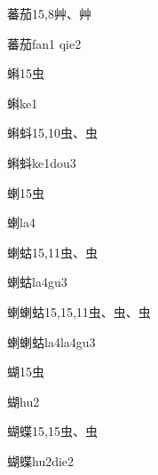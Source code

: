 \begin{Entry}{蕃茄}{15,8}{⾋、⾋}
  \begin{Phonetics}{蕃茄}{fan1 qie2}
  \end{Phonetics}
\end{Entry}

\begin{Entry}{蝌}{15}{⾍}
  \begin{Phonetics}{蝌}{ke1}
  \end{Phonetics}
\end{Entry}

\begin{Entry}{蝌蚪}{15,10}{⾍、⾍}
  \begin{Phonetics}{蝌蚪}{ke1dou3}
  \end{Phonetics}
\end{Entry}

\begin{Entry}{蝲}{15}{⾍}
  \begin{Phonetics}{蝲}{la4}
  \end{Phonetics}
\end{Entry}

\begin{Entry}{蝲蛄}{15,11}{⾍、⾍}
  \begin{Phonetics}{蝲蛄}{la4gu3}
  \end{Phonetics}
\end{Entry}

\begin{Entry}{蝲蝲蛄}{15,15,11}{⾍、⾍、⾍}
  \begin{Phonetics}{蝲蝲蛄}{la4la4gu3}
  \end{Phonetics}
\end{Entry}

\begin{Entry}{蝴}{15}{⾍}
  \begin{Phonetics}{蝴}{hu2}
  \end{Phonetics}
\end{Entry}

\begin{Entry}{蝴蝶}{15,15}{⾍、⾍}
  \begin{Phonetics}{蝴蝶}{hu2die2}
  \end{Phonetics}
\end{Entry}

